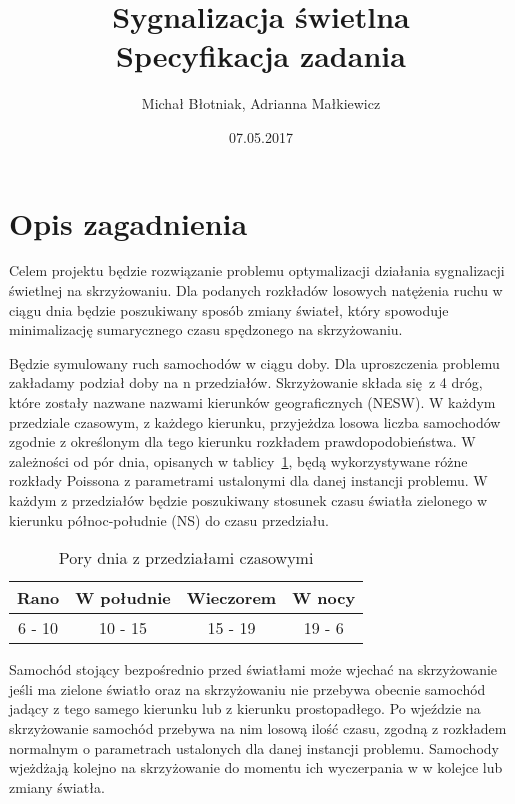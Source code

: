 \documentclass[a4paper]{article}
\title {
  Sygnalizacja świetlna
  \\ Specyfikacja zadania
}
\date{07.05.2017}
\author{Michał Błotniak, Adrianna Małkiewicz}
\begin{document}
\maketitle

\justify

\section{Opis zagadnienia}

Celem projektu będzie rozwiązanie problemu optymalizacji działania sygnalizacji
świetlnej na skrzyżowaniu. Dla podanych rozkładów losowych natężenia ruchu
w ciągu dnia będzie poszukiwany sposób zmiany świateł, który spowoduje
minimalizację sumarycznego czasu spędzonego na skrzyżowaniu.

Będzie symulowany ruch samochodów w ciągu doby. Dla uproszczenia problemu
zakładamy podział doby na n przedziałów. Skrzyżowanie składa się z 4 dróg, które
zostały nazwane nazwami kierunków geograficznych (NESW). W każdym przedziale
czasowym, z każdego kierunku, przyjeżdza losowa liczba samochodów zgodnie
z określonym dla tego kierunku rozkładem prawdopodobieństwa. W zależności od
pór dnia, opisanych w tablicy~\ref{tab:hours}, będą wykorzystywane różne
rozkłady Poissona z parametrami ustalonymi dla danej instancji problemu.
W każdym z przedziałów będzie poszukiwany stosunek czasu światła zielonego
w kierunku północ-południe (NS) do czasu przedziału.

\begin{table}[ht]
    \centering
    \begin{tabular}{| c | c | c | c |}
        \hline
        Rano & W południe & Wieczorem & W nocy \\ \hline
        6 - 10 & 10 - 15 & 15 - 19 & 19 - 6 \\ \hline
    \end{tabular}
    \caption{Pory dnia z przedziałami czasowymi\label{tab:hours}}
\end{table}

Samochód stojący bezpośrednio przed światłami może wjechać na skrzyżowanie
jeśli ma zielone światło oraz na skrzyżowaniu nie przebywa obecnie samochód
jadący z tego samego kierunku lub z kierunku prostopadłego. Po wjeździe na
skrzyżowanie samochód przebywa na nim losową ilość czasu, zgodną z rozkładem
normalnym o parametrach ustalonych dla danej instancji problemu. Samochody
wjeżdżają kolejno na skrzyżowanie do momentu ich wyczerpania w w kolejce
lub zmiany światła.
\end{document}
